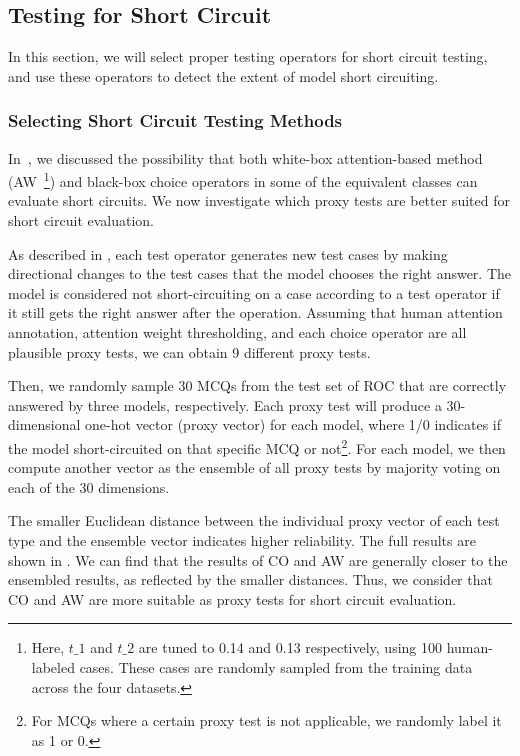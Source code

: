 \subsection{Testing for Short Circuit}
\label{sec:short_circuit}

In this section, we will select proper testing operators for short circuit testing, and use these operators to detect the extent of model short circuiting.

\subsubsection{Selecting Short Circuit Testing Methods}
\label{sec:select-sc}

In~, we discussed the possibility that both white-box 
attention-based method (AW~\footnote{Here, $t\_1$ and $t\_2$ are tuned to 0.14 and 0.13 respectively, using 100 human-labeled cases. These cases are randomly sampled from the training data across the four datasets.}) 
and black-box choice operators in some 
of the equivalent classes can evaluate 
short circuits. We now investigate which proxy tests are better suited for short circuit evaluation.

As described in , each test operator generates new test cases 
by making directional changes to the test cases that the model 
chooses the right answer. The model is considered not short-circuiting 
on a case according to a test operator if it still gets the 
right answer after the operation. Assuming that human attention 
annotation, attention weight thresholding, and each choice 
operator are all plausible proxy tests, we can obtain 9 
different proxy tests. 

Then, we randomly sample 30 MCQs 
from the test set of ROC that are correctly answered 
by three models, respectively. Each proxy test will 
produce a 30-dimensional one-hot vector (proxy vector) 
for each model, where 1/0 indicates if the model 
short-circuited on that specific MCQ or 
not\footnote{For MCQs where a certain proxy test is not applicable, we randomly label it as 1 or 0.}. 
For each model, we then compute another vector as the ensemble of all 
proxy tests by majority voting on each of the 30 dimensions. 

The smaller Euclidean distance between the individual 
proxy vector of each test type and the ensemble vector 
indicates higher reliability. The full results are shown in . We can find that the results of CO and AW are generally closer to the ensembled results, as reflected by the smaller distances. Thus, we consider that CO and AW are more suitable as proxy tests for short circuit evaluation.

